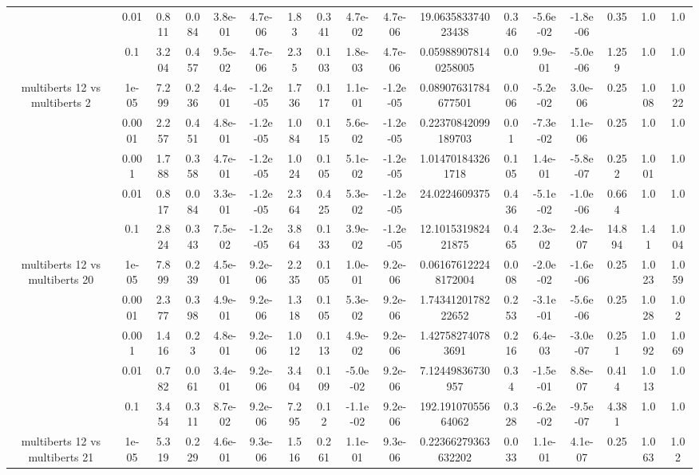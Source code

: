 \begin{tabular}{|c|c|c|c|c|c|c|c|c|c|c|c|c|c|c|c|c|}
 & 0.01 & 0.811 & 0.084 & 3.8e-01 & 4.7e-06 & 1.83 & 0.341 & 4.7e-02 & 4.7e-06 & 19.063583374023438 & 0.346 & -5.6e-02 & -1.8e-06 & 0.35 & 1.0 & 1.0 \\
 & 0.1 & 3.204 & 0.457 & 9.5e-02 & 4.7e-06 & 2.35 & 0.103 & 1.8e-03 & 4.7e-06 & 0.059889078140258005 & 0.0 & 9.9e-01 & -5.0e-06 & 1.259 & 1.0 & 1.0 \\
\hline
\multirow{5}{*}{multiberts 12 vs multiberts 2} & 1e-05 & 7.299 & 0.236 & 4.4e-01 & -1.2e-05 & 1.736 & 0.117 & 1.1e-01 & -1.2e-05 & 0.08907631784677501 & 0.006 & -5.2e-02 & 3.0e-06 & 0.25 & 1.008 & 1.022 \\
 & 0.0001 & 2.257 & 0.451 & 4.8e-01 & -1.2e-05 & 1.084 & 0.115 & 5.6e-02 & -1.2e-05 & 0.22370842099189703 & 0.01 & -7.3e-02 & 1.1e-06 & 0.25 & 1.0 & 1.0 \\
 & 0.001 & 1.788 & 0.358 & 4.7e-01 & -1.2e-05 & 1.024 & 0.105 & 5.1e-02 & -1.2e-05 & 1.014701843261718 & 0.105 & 1.4e-01 & -5.8e-07 & 0.252 & 1.001 & 1.0 \\
 & 0.01 & 0.817 & 0.084 & 3.3e-01 & -1.2e-05 & 2.364 & 0.425 & 5.3e-02 & -1.2e-05 & 24.0224609375 & 0.436 & -5.1e-02 & -1.0e-06 & 0.664 & 1.0 & 1.0 \\
 & 0.1 & 2.824 & 0.343 & 7.5e-02 & -1.2e-05 & 3.864 & 0.133 & 3.9e-02 & -1.2e-05 & 12.101531982421875 & 0.465 & 2.3e-02 & 2.4e-07 & 14.894 & 1.41 & 1.004 \\
\hline
\multirow{5}{*}{multiberts 12 vs multiberts 20} & 1e-05 & 7.899 & 0.239 & 4.5e-01 & 9.2e-06 & 2.235 & 0.105 & 1.0e-01 & 9.2e-06 & 0.061676122248172004 & 0.008 & -2.0e-02 & -1.6e-06 & 0.25 & 1.023 & 1.059 \\
 & 0.0001 & 2.377 & 0.398 & 4.9e-01 & 9.2e-06 & 1.318 & 0.105 & 5.3e-02 & 9.2e-06 & 1.7434120178222652 & 0.253 & -3.1e-01 & -5.6e-06 & 0.25 & 1.028 & 1.02 \\
 & 0.001 & 1.416 & 0.23 & 4.8e-01 & 9.2e-06 & 1.012 & 0.113 & 4.9e-02 & 9.2e-06 & 1.427582740783691 & 0.216 & 6.4e-03 & -3.0e-07 & 0.251 & 1.092 & 1.069 \\
 & 0.01 & 0.782 & 0.061 & 3.4e-01 & 9.2e-06 & 3.404 & 0.109 & -5.0e-02 & 9.2e-06 & 7.12449836730957 & 0.34 & -1.5e-01 & 8.8e-07 & 0.414 & 1.013 & 1.0 \\
 & 0.1 & 3.454 & 0.311 & 8.7e-02 & 9.2e-06 & 7.295 & 0.12 & -1.1e-02 & 9.2e-06 & 192.19107055664062 & 0.328 & -6.2e-02 & -9.5e-07 & 4.381 & 1.0 & 1.0 \\
\hline
\multirow{5}{*}{multiberts 12 vs multiberts 21} & 1e-05 & 5.319 & 0.229 & 4.6e-01 & 9.3e-06 & 1.516 & 0.261 & 1.1e-01 & 9.3e-06 & 0.22366279363632202 & 0.033 & 1.1e-01 & 4.1e-07 & 0.25 & 1.063 & 1.02 \\

\end{tabular}
